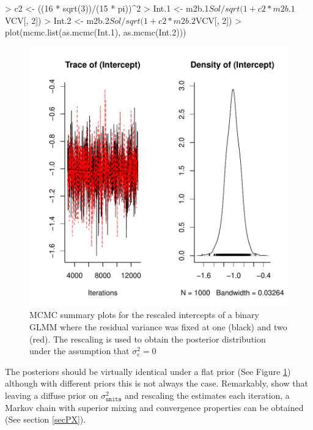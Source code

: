 \documentclass{article}
\begin{document}
\begin{Schunk}
\begin{Sinput}
> c2 <- ((16 * sqrt(3))/(15 * pi))^2
> Int.1 <- m2b.1$Sol/sqrt(1 + c2 * m2b.1$VCV[, 2])
> Int.2 <- m2b.2$Sol/sqrt(1 + c2 * m2b.2$VCV[, 2])
> plot(mcmc.list(as.mcmc(Int.1), as.mcmc(Int.2)))
\end{Sinput}
\end{Schunk}

\begin{figure}[!h]
\begin{center}
\includegraphics{Lecture2-072}
\end{center}
\caption{MCMC summary plots for the rescaled intercepts of a binary GLMM where the residual variance was fixed at one (black) and two (red). The rescaling is used to obtain the posterior distribution under the assumption that $\sigma^{2}_{e}=0$}
\label{ICI-fig}
\end{figure}

The posteriors should be virtually identical under a flat prior (See Figure \ref{ICI-fig}) although with different priors this is not always the case. Remarkably, \citep{vanDyk.2001} show that leaving a diffuse prior on $\sigma^{2}_{\texttt{units}}$ and rescaling the estimates each iteration, a Markov chain with superior mixing and convergence properties can be obtained (See section \ref{secPX}).\\  
\end{document}

